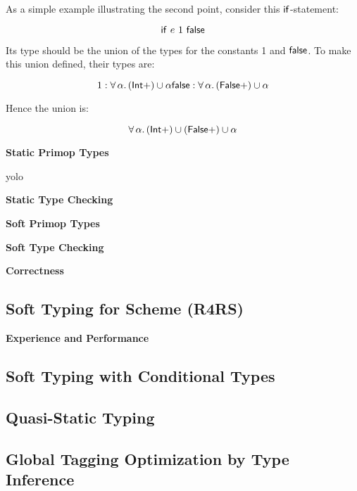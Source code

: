 \documentclass{article}
\begin{document}
As a simple example illustrating the second point, consider this $\mathsf{if}$-statement:

$$ \mathsf{if}~e~1~\mathsf{false} $$

Its type should be the union of the types for the constants 1 and $\mathsf{false}$.
To make this union defined, their types are:

$$ 1 : \forall\,\alpha.\,(\mathsf{Int} +) \cup \alpha
   \\
   \mathsf{false} : \forall\,\alpha.\,(\mathsf{False} +) \cup \alpha$$

Hence the union is:

$$ \forall\,\alpha.\,(\mathsf{Int} +) \cup (\mathsf{False} +) \cup \alpha $$

\noindent \textbf{Static Primop Types}

yolo

\noindent \textbf{Static Type Checking}

\noindent \textbf{Soft Primop Types}

\noindent \textbf{Soft Type Checking}

\noindent \textbf{Correctness}


\subsection*{Soft Typing for Scheme (R4RS)}

\textbf{Experience and Performance}



\subsection*{Soft Typing with Conditional Types}
\label{sec:awl-popl-1994}


\subsection*{Quasi-Static Typing}
\label{sec:t-popl-1990}

\subsection*{Global Tagging Optimization by Type Inference}
\label{sec:h-lfp-1992}
\end{document}
